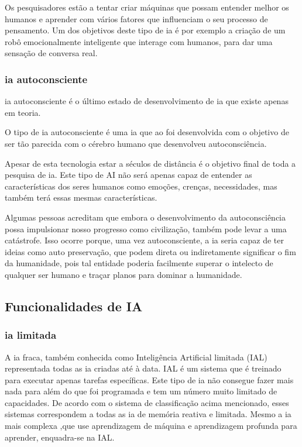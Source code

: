 \documentclass{report}
\begin{document}
Os pesquisadores estão a tentar criar máquinas que possam entender melhor os humanos e aprender com vários fatores que influenciam o seu processo de pensamento. Um dos objetivos deste tipo de \ac{ia} é por exemplo a criação de um robô emocionalmente inteligente que interage com humanos, para dar uma sensação de conversa real.

\subsubsection{\ac{ia} autoconsciente}
\ac{ia} autoconsciente é o último estado de desenvolvimento de \ac{ia} que existe apenas em teoria.

O tipo de \ac{ia} autoconsciente é uma \ac{ia} que ao foi desenvolvida com o objetivo de ser tão parecida com o cérebro humano que desenvolveu autoconsciência.

Apesar de esta tecnologia estar a séculos de distância é o objetivo final de toda a pesquisa de \ac{ia}. Este tipo de AI não será apenas capaz de entender as características dos seres humanos como emoções, crenças, necessidades, mas também terá essas mesmas características.

Algumas pessoas acreditam que embora o desenvolvimento da autoconsciência possa impulsionar nosso progresso como civilização, também pode levar a uma catástrofe. Isso ocorre porque, uma vez autoconsciente, a \ac{ia} seria capaz de ter ideias como auto preservação, que podem direta ou indiretamente significar o fim da humanidade, pois tal entidade poderia facilmente superar o intelecto de qualquer ser humano e traçar planos para dominar a humanidade.

\subsection{Funcionalidades de IA}
\subsubsection{\ac{ia} limitada}
A \ac{ia} fraca, também conhecida como Inteligência Artificial limitada (IAL) representada todas as \ac{ia} criadas até à data. IAL é um sistema que é treinado para executar apenas tarefas específicas.  Este tipo de \ac{ia} não consegue fazer mais nada para além do que foi programada e tem um número muito limitado de capacidades. De acordo com o sistema de classificação acima mencionado, esses sistemas correspondem a todas as \ac{ia} de memória reativa e limitada. Mesmo a \ac{ia} mais complexa ,que use aprendizagem de máquina e aprendizagem profunda para aprender, enquadra-se na IAL.
\end{document}

